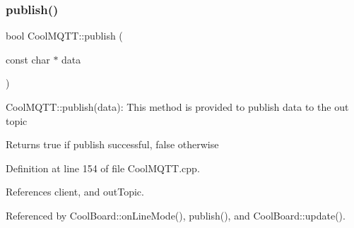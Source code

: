 \subsubsection{\texorpdfstring{publish()}{publish()}\hspace{0.1cm}{\footnotesize\ttfamily [1/2]}}
{\footnotesize\ttfamily bool Cool\+M\+Q\+T\+T\+::publish (\begin{DoxyParamCaption}\item[{const char $\ast$}]{data }\end{DoxyParamCaption})}

Cool\+M\+Q\+T\+T\+::publish(data)\+: This method is provided to publish data to the out topic

\begin{DoxyReturn}{Returns}
true if publish successful, false otherwise 
\end{DoxyReturn}


Definition at line 154 of file Cool\+M\+Q\+T\+T.\+cpp.



References client, and out\+Topic.



Referenced by Cool\+Board\+::on\+Line\+Mode(), publish(), and Cool\+Board\+::update().


